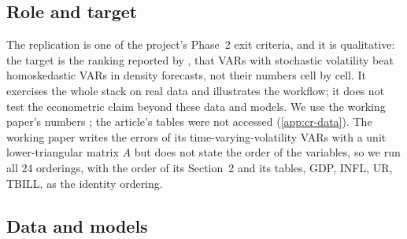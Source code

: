 \subsection{Role and target}\label{sec:replication-role}\label{sec:replication-target}

The replication is one of the project's Phase~2 exit criteria, and it is qualitative: the target
is the ranking reported by \citet{clark2015macroeconomic}, that VARs with stochastic volatility
beat homoskedastic VARs in density forecasts, not their numbers cell by cell. %
It exercises the whole stack on real data and illustrates the workflow; it does not test the
econometric claim beyond these data and models.
We use the working paper's numbers \citep[Tables~1--3, VAR block]{clark2012macroeconomic}; the
article's tables were not accessed (\cref{app:cr-data}). %
The working paper writes the errors of its time-varying-volatility VARs with a unit
lower-triangular matrix $A$ \citep[Section~3.2, eqs.~7--11]{clark2012macroeconomic} but does not
state the order of the variables, so we run all $24$ orderings, with the order of its Section~2 and
its tables, GDP, INFL, UR, TBILL, as the identity ordering. %

\subsection{Data and models}\label{sec:replication-data}\label{sec:replication-models}

